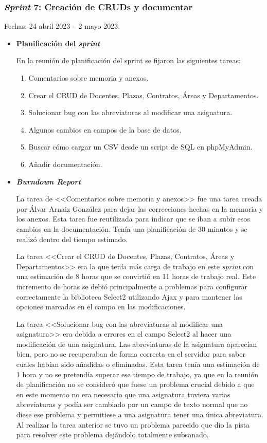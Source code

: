 \subsubsection{\textit{Sprint} 7: Creación de CRUDs y documentar}
Fechas: 24 abril 2023 -- 2 mayo 2023.
\begin{itemize}
\item\textbf{Planificación del \textit{sprint}}


En la reunión de planificación del sprint se fijaron las siguientes tareas:
\begin{enumerate}
		\item Comentarios sobre memoria y anexos.
		\item Crear el CRUD de Docentes, Plazas, Contratos, Áreas y Departamentos.
		\item Solucionar bug con las abreviaturas al modificar una asignatura.
		\item Algunos cambios en campos de la base de datos.
		\item Buscar cómo cargar un CSV desde un script de SQL en phpMyAdmin.
		\item Añadir documentación.
\end{enumerate}

\item\textbf{\textit{Burndown Report}}

La tarea de <<Comentarios sobre memoria y anexos>> fue una tarea creada por Álvar Arnaiz González para dejar las correcciones hechas en la memoria y los anexos. 
Esta tarea fue reutilizada para indicar que se iban a subir esos cambios en la documentación. 
Tenía una planificación de 30 minutos y se realizó dentro del tiempo estimado.

La tarea <<Crear el CRUD de Docentes, Plazas, Contratos, Áreas y Departamentos>> era la que tenía más carga de trabajo en este \textit{sprint} con una estimación de 8 horas que se convirtió en 11 horas de trabajo real.
Este incremento de horas se debió principalmente a problemas para configurar correctamente la biblioteca Select2 utilizando Ajax y para mantener las opciones marcadas en el campo en las modificaciones.

La tarea <<Solucionar bug con las abreviaturas al modificar una asignatura>> era debida a errores en el campo Select2 al hacer una modificación de una asignatura. 
Las abreviaturas de la asignatura aparecían bien, pero no se recuperaban de forma correcta en el servidor para saber cuales habían sido añadidas o eliminadas.
Esta tarea tenía una estimación de 1 hora y no se pretendía superar ese tiempo de trabajo, ya que en la reunión de planificación no se consideró que fuese un problema crucial debido a que en este momento no era necesario que una asignatura tuviera varias abreviaturas y podía ser cambiado por un campo de texto normal que no diese ese problema y permitiese a una asignatura tener una única abreviatura.
Al realizar la tarea anterior se tuvo un problema parecido que dio la pista para resolver este problema dejándolo totalmente subsanado.


\end{itemize}

